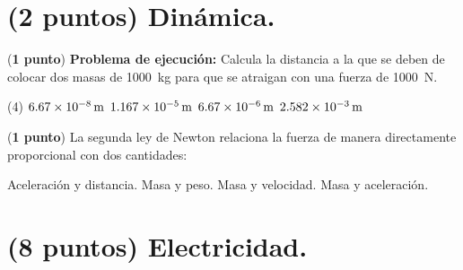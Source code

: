 \documentclass[12pt, letter]{exam}
\begin{document}


\newpage

\begin{questions}
    \section{(2 puntos) Dinámica.}

    \question (\textbf{1 punto}) \label{Problema_01} \textbf{Problema de ejecución: } Calcula la distancia a la que se deben de colocar dos masas de \SI{1000}{\kilo\gram} para que se atraigan con una fuerza de \SI{1000}{\newton}.
    \begin{tasks}(4)
        \task $\SI{6.67d-8}{\meter}$
        \task $\SI{1.167d-5}{\meter}$
        \task $\SI{6.67d-6}{\meter}$
        \task $\SI{2.582d-3}{\meter}$
    \end{tasks}
    \question (\textbf{1 punto}) La segunda ley de Newton relaciona la fuerza de manera directamente proporcional con dos cantidades:
    \begin{multicols}{2}
    \begin{tasks}
        \task Aceleración y distancia.
        \task Masa y peso.
        \task Masa y velocidad.
        \task Masa y aceleración.
    \end{tasks}
    \end{multicols}
    

    \section{(8 puntos) Electricidad.}


\end{questions}
\end{document}
